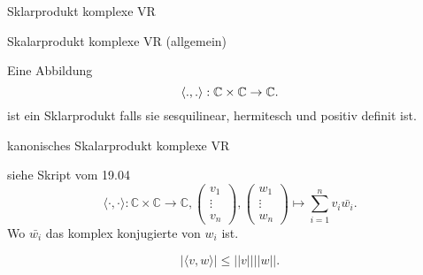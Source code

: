 \documentclass[class=article, crop=false]{standalone}
\begin{document}
\begin{zettel}{Sklarprodukt komplexe VR}
\begin{flashcard}
\begin{question}
Skalarprodukt komplexe VR (allgemein)
\end{question}
    \begin{definition}
    Eine Abbildung
\[
 \langle .,.\rangle : \mathbb{C} \times \mathbb{C} \to \mathbb{C} 
.\]
ist ein Sklarprodukt falls sie sesquilinear, hermitesch und positiv definit ist.
\end{definition}
\end{flashcard}

\begin{flashcard}
\begin{question}
kanonisches Skalarprodukt komplexe VR
\end{question}
\begin{definition}
    siehe Skript vom 19.04
    \[
        \langle \cdot,\cdot\rangle : \mathbb{C} \times \mathbb{C} \longrightarrow  \mathbb{C}, \begin{pmatrix}v_1 \\ \vdots \\ v_n\end{pmatrix}, \begin{pmatrix}w_1 \\ \vdots \\ w_n\end{pmatrix} \mapsto \sum_{i = 1}^{n} v_i \bar{w_i} 
    .\]
    Wo $ \bar{w_i} $ das komplex konjugierte von $w_i $ ist.
\end{definition}
\end{flashcard}
\begin{lemma}
    \[
        |\langle v,w\rangle| \leq  ||v|| ||w||
    .\]
    
\end{lemma}
\end{zettel}
\end{document}
